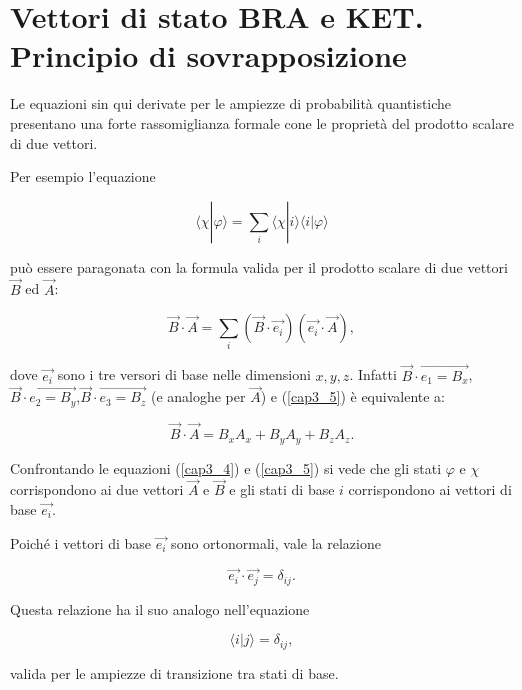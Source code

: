 \section[Principio di sovrapposizione]{Vettori di stato BRA e KET. Principio di sovrapposizione} 

Le equazioni sin qui derivate per le ampiezze di probabilità quantistiche presentano una forte rassomiglianza formale cone le proprietà del prodotto scalare di due vettori.

Per esempio l'equazione

\begin{equation}
\langle \chi | \varphi \rangle =\sum \limits_{i}\langle \chi | i \rangle \langle i | \varphi \rangle
\label{cap3_4}
\end{equation}

può essere paragonata con la formula valida per il prodotto scalare di due vettori $\vec{B}$ ed $\vec{A}$:

\begin{equation}
\vec{B} \cdot \vec{A}= \sum \limits_{i} (\vec{B} \cdot  \vec{e_i})(\vec{e_i} \cdot \vec{A}) ,
\label{cap3_5}
\end{equation}

dove $\vec{e_i}$ sono i tre versori di base nelle dimensioni $x,y,z$. Infatti $\vec{B}\cdot \vec{e_1=B_x}$, $\vec{B}\cdot \vec{e_2=B_y}$,$\vec{B}\cdot \vec{e_3=B_z}$ (e analoghe per  $\vec{A}$) e (\eqref{cap3_5}) è equivalente a:

\begin{equation}
\vec{B} \cdot \vec{A} = B_xA_x+B_yA_y+B_zA_z .
\end{equation}

Confrontando le equazioni (\ref{cap3_4}) e (\ref{cap3_5}) si vede che gli stati $\varphi$ e $\chi$ corrispondono ai due vettori $\vec{A}$ e $\vec{B}$ e gli stati di base $i$ corrispondono ai vettori di base $\vec{e_i}$.

Poiché i vettori di base $\vec{e_i}$ sono ortonormali, vale la relazione

\begin{equation}
\vec{e_i} \cdot \vec{e_j}= \delta_{ij} .
\end{equation}

Questa relazione ha il suo analogo nell'equazione

\begin{equation}
\langle i | j \rangle = \delta_{ij} ,
\end{equation}

valida per le ampiezze di transizione tra stati di base.


